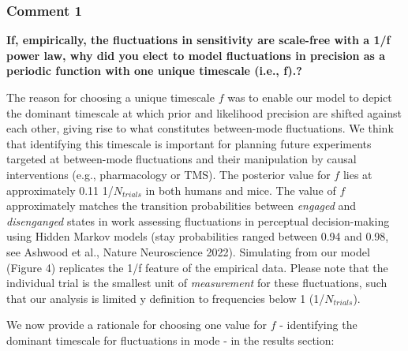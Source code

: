 \documentclass[
]{article}
\begin{document}
\hypertarget{comment-1}{%
\subsubsection{Comment 1}\label{comment-1}}

\textbf{If, empirically, the fluctuations in sensitivity are scale-free
with a 1/f power law, why did you elect to model fluctuations in
precision as a periodic function with one unique timescale (i.e., f).?}

The reason for choosing a unique timescale \(f\) was to enable our model
to depict the dominant timescale at which prior and likelihood precision
are shifted against each other, giving rise to what constitutes
between-mode fluctuations. We think that identifying this timescale is
important for planning future experiments targeted at between-mode
fluctuations and their manipulation by causal interventions (e.g.,
pharmacology or TMS). The posterior value for \(f\) lies at
approximately 0.11 1/\(N_{trials}\) in both humans and mice. The value
of \(f\) approximately matches the transition probabilities between
\emph{engaged} and \emph{disenganged} states in work assessing
fluctuations in perceptual decision-making using Hidden Markov models
(stay probabilities ranged between 0.94 and 0.98, see Ashwood et al.,
Nature Neuroscience 2022). Simulating from our model (Figure 4)
replicates the 1/f feature of the empirical data. Please note that the
individual trial is the smallest unit of \emph{measurement} for these
fluctuations, such that our analysis is limited y definition to
frequencies below 1 (1/\(N_{trials}\)).

We now provide a rationale for choosing one value for \(f\) -
identifying the dominant timescale for fluctuations in mode - in the
results section:
\end{document}
